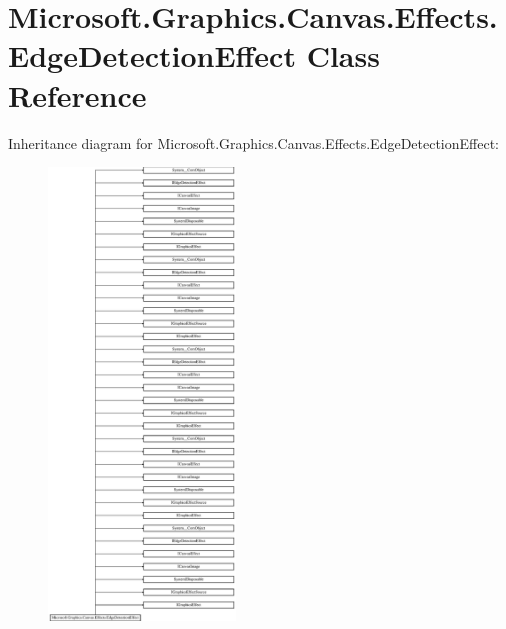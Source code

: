 \hypertarget{class_microsoft_1_1_graphics_1_1_canvas_1_1_effects_1_1_edge_detection_effect}{}\section{Microsoft.\+Graphics.\+Canvas.\+Effects.\+Edge\+Detection\+Effect Class Reference}
\label{class_microsoft_1_1_graphics_1_1_canvas_1_1_effects_1_1_edge_detection_effect}
Inheritance diagram for Microsoft.\+Graphics.\+Canvas.\+Effects.\+Edge\+Detection\+Effect\+:\begin{figure}[H]
\begin{center}
\leavevmode
\includegraphics[height=12.000000cm]{class_microsoft_1_1_graphics_1_1_canvas_1_1_effects_1_1_edge_detection_effect}
\end{center}
\end{figure}
